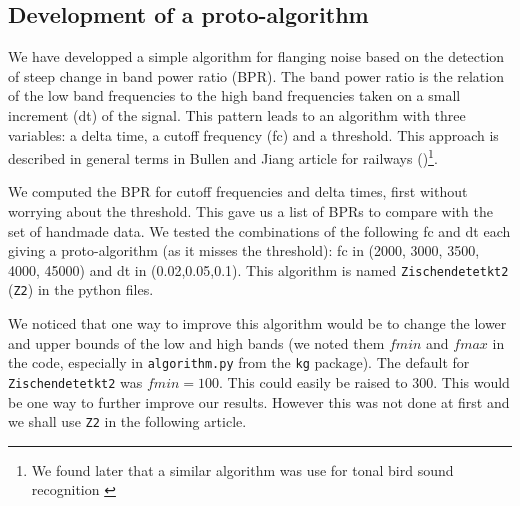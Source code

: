 \documentclass{article}\usepackage[]{graphicx}\usepackage[]{color}
\begin{document}
\subsection{Development of a proto-algorithm} We have developped a simple algorithm for flanging noise based on the detection of steep change in band power ratio (BPR). The band power ratio is the relation of the low band frequencies to the high band frequencies taken on a small increment (dt) of the signal. This pattern leads to an algorithm with three variables: a delta time, a cutoff frequency (fc) and a threshold. This approach is described in general terms in Bullen and Jiang article for railways (\citeyear{Bullen2010})\footnote{We found later that a similar algorithm was use for tonal bird sound recognition \autocite{Jancovic2011}}.

We computed the BPR for cutoff frequencies and delta times, first without worrying about the threshold. This gave us a list of BPRs to compare with the set of handmade data. We tested the combinations of the following fc and dt each giving a proto-algorithm (as it misses the threshold): fc in (2000, 3000, 3500, 4000, 45000) and dt in (0.02,0.05,0.1). This algorithm is named {\tt Zischendetetkt2} ({\tt Z2}) in the python files.

We noticed that one way to improve this algorithm would be to change the lower and upper bounds of the low and high bands (we noted them $fmin$ and $fmax$ in the code, especially in {\tt algorithm.py} from the {\tt kg} package). The default for {\tt Zischendetetkt2} was $fmin=100$. This could easily be raised to $300$. This would be one way to further improve our results. However this was not done at first and we shall use {\tt Z2} in the following article.
\end{document}
